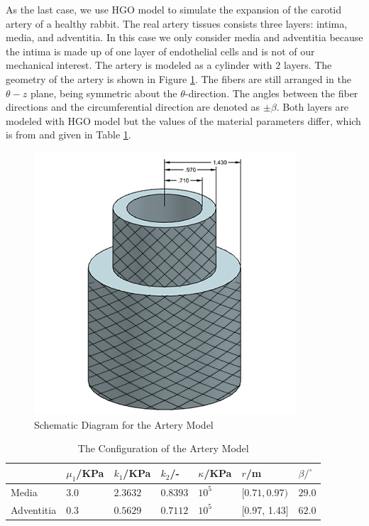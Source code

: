 As the last case, we use HGO model to simulate the expansion of the carotid artery of a healthy rabbit. The real artery tissues consists three layers: intima, media, and adventitia. In this case we only consider media and adventitia because the intima is made up of one layer of endothelial cells and is not of our mechanical interest. The artery is modeled as a cylinder with $2$ layers. The geometry of the artery is shown in Figure \ref{fig:vessel_schematic3}. The fibers are still arranged in the $\theta-z$ plane, being symmetric about the $\theta$-direction. The angles between the fiber directions and the circumferential direction are denoted as $\pm\beta$. Both layers are modeled with HGO model but the values of the material parameters differ, which is from \cite{Holzapfel2} and given in Table \ref{table:artery}.

\begin{figure}[h!]
\centering
\includegraphics[width=.3\textwidth]{./figures/vessel_schematic3.png}
\caption{Schematic Diagram for the Artery Model}
\label{fig:vessel_schematic3}
\end{figure}

\begin{table}
\centering
\caption{The Configuration of the Artery Model}
\label{table:artery}
\begin{tabular}{  p{2.0cm}  p{1.5cm}  p{1.5cm}  p{1.5cm}  p{1.5cm}  p{2.0cm}  p{1.5cm} }
\hline
& $\mu_1$/KPa & $k_1$/KPa & $k_2$/- & $\kappa$/KPa & $r$/m & $\beta/^\circ$ \\
 \hline
 Media &   $3.0$ & $2.3632$ & $0.8393$ & $10^5$ & $[0.71, 0.97)$ & $29.0$\\
 Adventitia & $0.3$ & $0.5629$ & $0.7112$ & $10^5$ & [0.97, 1.43] & $62.0$\\
 \hline
\end{tabular}
\end{table}

